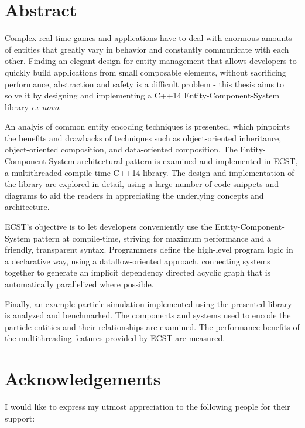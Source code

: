 \documentclass[oneside, 12pt, a4paper, openany]{book}
\begin{document}
\chapter*{Abstract}\label{abstract}

Complex real-time games and applications have to deal with enormous
amounts of entities that greatly vary in behavior and constantly
communicate with each other. Finding an elegant design for entity
management that allows developers to quickly build applications from
small composable elements, without sacrificing performance, abstraction
and safety is a difficult problem - this thesis aims to solve it by
designing and implementing a C++14 Entity-Component-System library
\emph{ex novo}.

An analyis of common entity encoding techniques is presented, which
pinpoints the benefits and drawbacks of techniques such as
object-oriented inheritance, object-oriented composition, and
data-oriented composition. The Entity-Component-System architectural
pattern is examined and implemented in ECST, a multithreaded
compile-time C++14 library. The design and implementation of the library
are explored in detail, using a large number of code snippets and
diagrams to aid the readers in appreciating the underlying concepts and
architecture.

ECST's objective is to let developers conveniently use the
Entity-Component-System pattern at compile-time, striving for maximum
performance and a friendly, transparent syntax. Programmers define the
high-level program logic in a declarative way, using a dataflow-oriented
approach, connecting systems together to generate an implicit dependency
directed acyclic graph that is automatically parallelized where
possible.

Finally, an example particle simulation implemented using the presented
library is analyzed and benchmarked. The components and systems used to
encode the particle entities and their relationships are examined. The
performance benefits of the multithreading features provided by ECST are
measured.

\chapter*{Acknowledgements}\label{acknowledgements}

I would like to express my utmost appreciation to the following people
for their support:
\end{document}
